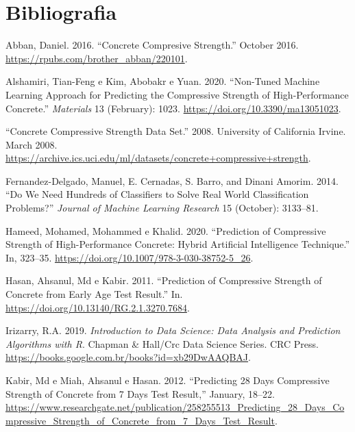 \documentclass[]{article}
\begin{document}
\hypertarget{bibliografia}{%
\section{Bibliografia}\label{bibliografia}}

\hypertarget{refs}{}
\leavevmode\hypertarget{ref-Abban2016}{}%
Abban, Daniel. 2016. ``Concrete Compresive Strength.'' October 2016.
\url{https://rpubs.com/brother_abban/220101}.

\leavevmode\hypertarget{ref-Alshamiri2020}{}%
Alshamiri, Tian-Feng e Kim, Abobakr e Yuan. 2020. ``Non-Tuned Machine
Learning Approach for Predicting the Compressive Strength of
High-Performance Concrete.'' \emph{Materials} 13 (February): 1023.
\url{https://doi.org/10.3390/ma13051023}.

\leavevmode\hypertarget{ref-downloadData}{}%
``Concrete Compressive Strength Data Set.'' 2008. University of
California Irvine. March 2008.
\url{https://archive.ics.uci.edu/ml/datasets/concrete+compressive+strength}.

\leavevmode\hypertarget{ref-Fernandez2014}{}%
Fernandez-Delgado, Manuel, E. Cernadas, S. Barro, and Dinani Amorim.
2014. ``Do We Need Hundreds of Classifiers to Solve Real World
Classification Problems?'' \emph{Journal of Machine Learning Research}
15 (October): 3133--81.

\leavevmode\hypertarget{ref-Hameed2020}{}%
Hameed, Mohamed, Mohammed e Khalid. 2020. ``Prediction of Compressive
Strength of High-Performance Concrete: Hybrid Artificial Intelligence
Technique.'' In, 323--35.
\url{https://doi.org/10.1007/978-3-030-38752-5_26}.

\leavevmode\hypertarget{ref-Hasan2011}{}%
Hasan, Ahsanul, Md e Kabir. 2011. ``Prediction of Compressive Strength
of Concrete from Early Age Test Result.'' In.
\url{https://doi.org/10.13140/RG.2.1.3270.7684}.

\leavevmode\hypertarget{ref-irizarry2019}{}%
Irizarry, R.A. 2019. \emph{Introduction to Data Science: Data Analysis
and Prediction Algorithms with R}. Chapman \& Hall/Crc Data Science
Series. CRC Press.
\url{https://books.google.com.br/books?id=xb29DwAAQBAJ}.

\leavevmode\hypertarget{ref-Kabir2012}{}%
Kabir, Md e Miah, Ahsanul e Hasan. 2012. ``Predicting 28 Days
Compressive Strength of Concrete from 7 Days Test Result,'' January,
18--22.
\url{https://www.researchgate.net/publication/258255513_Predicting_28_Days_Compressive_Strength_of_Concrete_from_7_Days_Test_Result}.
\end{document}
